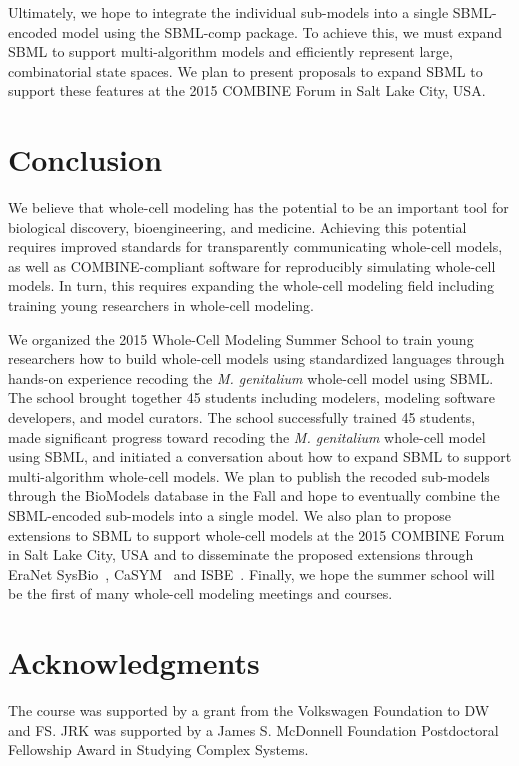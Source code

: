 \documentclass[journal,transmag]{IEEEtran}
\begin{document}
Ultimately, we hope to integrate the individual sub-models into a single SBML-encoded model using the SBML-comp package. To achieve this, we must expand SBML to support multi-algorithm models and efficiently represent large, combinatorial state spaces. We plan to present proposals to expand SBML to support these features at the 2015 COMBINE Forum in Salt Lake City, USA.

\section{Conclusion}
We believe that whole-cell modeling has the potential to be an important tool for biological discovery, bioengineering, and medicine.
Achieving this potential requires improved standards for transparently communicating whole-cell models, as well as COMBINE-compliant software for reproducibly simulating whole-cell models.
In turn, this requires expanding the whole-cell modeling field including training young researchers in whole-cell modeling.

We organized the 2015 Whole-Cell Modeling Summer School to train young researchers how to build whole-cell models using standardized languages through hands-on experience recoding the \textit{M. genitalium} whole-cell model using SBML. 
The school brought together 45 students including modelers, modeling software developers, and model curators. 
The school successfully trained 45 students, made significant progress toward recoding the \textit{M. genitalium} whole-cell model using SBML, and initiated a conversation about how to expand SBML to support multi-algorithm whole-cell models. 
We plan to publish the recoded sub-models through the BioModels database in the Fall and hope to eventually combine the SBML-encoded sub-models into a single model. 
We also plan to propose extensions to SBML to support whole-cell models at the 2015 COMBINE Forum in Salt Lake City, USA and to disseminate the proposed extensions through EraNet SysBio~\cite{ERASysBio2015}, CaSYM~\cite{CaSYM2015} and ISBE~\cite{Wolkenhauer2009}.
Finally, we hope the summer school will be the first of many whole-cell modeling meetings and courses.

\section*{Acknowledgments}
The course was supported by a grant from the Volkswagen Foundation to DW and FS. JRK was supported by a James S. McDonnell Foundation Postdoctoral Fellowship Award in Studying Complex Systems.
\end{document}
